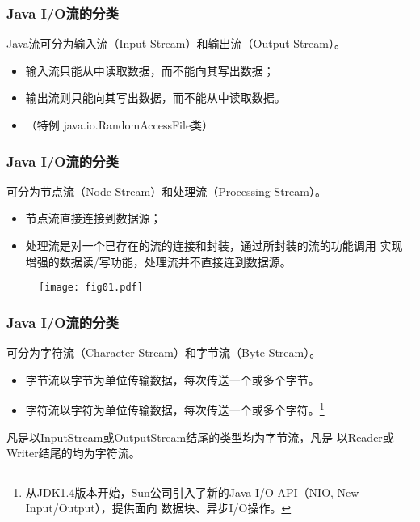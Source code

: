 \begin{frame}[fragile] %
  \frametitle{Java I/O流的分类}


  {\hei Java流可分为输入流（Input Stream）和输出流（Output Stream）。}

  \begin{itemize}
  \item 输入流只能从中读取数据，而不能向其写出数据；
  \item 输出流则只能向其写出数据，而不能从中读取数据。
  \item {\Mage （特例 java.io.RandomAccessFile类）}
  \end{itemize}
\end{frame}

\begin{frame}[fragile] %
  \frametitle{Java I/O流的分类}


  {\hei 可分为节点流（Node Stream）和处理流（Processing Stream）。}

  \begin{itemize}
  \item 节点流直接连接到数据源；
  \item 处理流是对一个已存在的流的连接和封装，通过所封装的流的功能调用
    实现增强的数据读/写功能，处理流并不直接连到数据源。
  \end{itemize}

  \begin{figure}
    \centering
    \texttt{[image: fig01.pdf]}
  \end{figure}
\end{frame}

\begin{frame}[fragile] %
  \frametitle{Java I/O流的分类}


  {\hei 可分为字符流（Character Stream）和字节流（Byte
    Stream）。}

  \begin{itemize}
  \item 字节流以字节为单位传输数据，每次传送一个或多个字节。
  \item 字符流以字符为单位传输数据，每次传送一个或多个字符。\footnote{从JDK1.4版本开始，Sun公司引入了新的Java I/O API（NIO, New Input/Output），提供面向
    数据块、异步I/O操作。}
\end{itemize}

  凡是以InputStream或OutputStream结尾的类型均为{\hei 字节流}，凡是
  以Reader或Writer结尾的均为{\hei 字符流。}
\end{frame}

